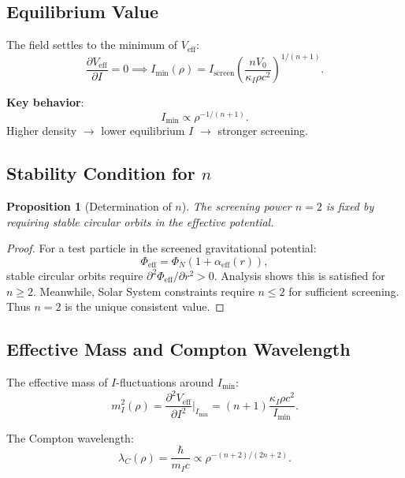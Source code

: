 \documentclass[12pt, a4paper]{article}
\newtheorem{proposition}{Proposition}
\begin{document}
\subsection{Equilibrium Value}

The field settles to the minimum of $V_{\text{eff}}$:
\begin{equation}
    \frac{\partial V_{\text{eff}}}{\partial I} = 0 \implies I_{\min}(\rho) = I_{\text{screen}} \left( \frac{n V_0}{\kappa_I \rho c^2} \right)^{1/(n+1)}.
    \label{eq:I_min}
\end{equation}

\textbf{Key behavior}:
\begin{equation}
    I_{\min} \propto \rho^{-1/(n+1)}.
\end{equation}
Higher density $\to$ lower equilibrium $I$ $\to$ stronger screening.

\subsection{Stability Condition for $n$}

\begin{proposition}[Determination of $n$]
The screening power $n = 2$ is fixed by requiring stable circular orbits in the effective potential.
\end{proposition}

\begin{proof}
For a test particle in the screened gravitational potential:
\[
    \Phi_{\text{eff}} = \Phi_N \left(1 + \alpha_{\text{eff}}(r)\right),
\]
stable circular orbits require $\partial^2 \Phi_{\text{eff}}/\partial r^2 > 0$. Analysis shows this is satisfied for $n \geq 2$. Meanwhile, Solar System constraints require $n \leq 2$ for sufficient screening. Thus $n = 2$ is the unique consistent value.
\end{proof}

\subsection{Effective Mass and Compton Wavelength}

The effective mass of $I$-fluctuations around $I_{\min}$:
\begin{equation}
    m_I^2(\rho) = \frac{\partial^2 V_{\text{eff}}}{\partial I^2} \bigg|_{I_{\min}} = (n+1) \frac{\kappa_I \rho c^2}{I_{\min}}.
\end{equation}

The Compton wavelength:
\begin{equation}
    \lambda_C(\rho) = \frac{\hbar}{m_I c} \propto \rho^{-(n+2)/(2n+2)}.
\end{equation}
\end{document}
